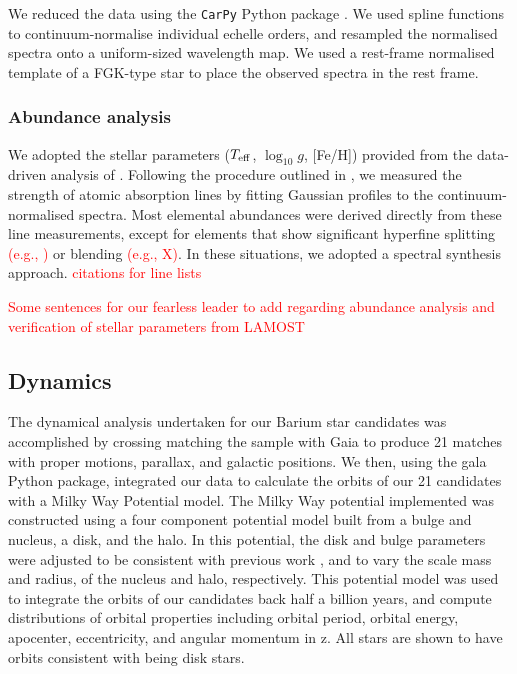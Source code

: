 \documentclass[a4paper,fleqn,usenatbib]{mnras}
\newcommand{\todo}[1]{\textcolor{red}{#1}}
\begin{document}
We reduced the data using the \texttt{CarPy} Python package \citep{kelson2000,kelson2003}. We used spline functions to continuum-normalise individual echelle orders, and resampled the normalised spectra onto a uniform-sized wavelength map. We used a rest-frame normalised template of a FGK-type star to place the observed spectra in the rest frame.


\subsubsection{Abundance analysis}
We adopted the stellar parameters ($T_{\rm eff}$, $\log_{10}g$, [Fe/H]) provided from the data-driven analysis of \citep{ho2017}. Following the procedure outlined in \citep{casey2014}, we measured the strength of atomic absorption lines by fitting Gaussian profiles to the continuum-normalised spectra. Most elemental abundances were derived directly from these line measurements, except for elements that show significant hyperfine splitting \todo{(e.g., )} or blending \todo{(e.g., X)}. In these situations, we adopted a spectral synthesis approach. \todo{citations for line lists}


\todo{Some sentences for our fearless leader to add regarding abundance analysis and verification of stellar parameters from LAMOST}


\subsection{Dynamics}
The dynamical analysis undertaken for our Barium star candidates was accomplished by crossing matching the sample with Gaia \citep{gaia2016a,gaia2016b} to produce 21 matches with proper motions, parallax, and galactic positions. We then, using the gala Python package, integrated our data to calculate the orbits of our 21 candidates with a Milky Way Potential model. The Milky Way potential implemented was constructed using a four component potential model built from a \citet{hernquist1990} bulge and nucleus, a \citet{miyamoto1975} disk, and the \citet{nfw1997} halo. In this potential, the disk and bulge parameters were adjusted to be consistent with previous work \citep{bovy2015}, and to vary the scale mass and radius, of the nucleus and halo, respectively. This potential model was used to integrate the orbits of our candidates back half a billion years, and compute distributions of orbital properties including orbital period, orbital energy, apocenter, eccentricity, and angular momentum in z. All stars are shown to have orbits consistent with being disk stars.
\end{document}
